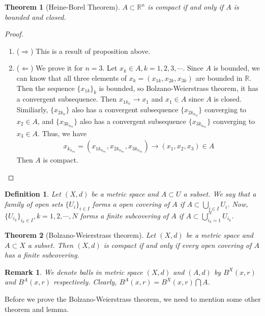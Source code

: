 \documentclass[12pt,leqno]{amsart}
\newtheorem{definition}{Definition}[section]
\newtheorem{theorem}{Theorem}[section]
\newtheorem{remark}{Remark}[section]
\theoremstyle{definition}
\numberwithin{equation}{subsection}
\begin{document}
\begin{theorem}[Heine-Borel Theorem]
$A\subset \mathbb{R}^n$ is compact if and only if $A$ is bounded and closed.
\end{theorem}
\begin{proof}
~\begin{enumerate}
    \item ($\Rightarrow$) This is a result of proposition above.
    \item ($\Leftarrow$) We prove it for $n = 3$. Let $x_k\in A, k = 1,2,3,\cdots$. Since $A$ is bounded, we can know that all three elements of $x_k = (x_{1k},x_{2k},x_{3k})$ are bounded in $\mathbb{R}$. Then the sequence $\{x_{1k}\}_k$ is bounded, so Bolzano-Weierstrass theorem, it has a convergent subsequence. Then $x_{1k_n}\to x_1$ and $x_1\in A$ since $A$ is closed. Similiarly, $\{x_{2k_n}\}$ also has a convergent subsequence $\{x_{2k_{n_m}}\}$ converging to $x_2\in A$, and $\{x_{3k_{n_m}}\}$ also has a convergent subsequence $\{x_{3k_{n_{m_l}}}\}$ converging to $x_3\in A$. Thus, we have 
    \begin{align*}
        x_{k_{n_{m_l}}} = \left(x_{1k_{n_{m_l}}},x_{2k_{n_{m_l}}},x_{3k_{n_{m_l}}}\right)\to (x_1,x_2,x_3)\in A
    \end{align*}
    Then $A$ is compact.
\end{enumerate}
\end{proof}

\medskip

\begin{definition}
Let $(X,d)$ be a metric space and $A\subset U$ a subset. We say that a family of open sets $\{U_i\}_{i\in I}$ forms a open covering of $A$ if $A\subset  \bigcup_{i\in I} U_i$. Now, $\{U_{i_k}\}_{i_k\in I}, k = 1,2,\cdots,N$ forms a finite subcovering of $A$ if $A\subset \bigcup_{i_k=1}^N U_{i_k}$.
\end{definition}

\medskip

\begin{theorem}[Bolzano-Weierstrass theorem]
Let $(X,d)$ be a metric space and $A\subset X$ a subset. Then $(X,d)$ is compact if and only if every open covering of $A$ has a finite subcovering.
\end{theorem}
\begin{remark}
We denote balls in metric space $(X,d)$ and $(A,d)$ by $B^X(x,r)$ and $B^A(x,r)$ respectively. Clearly, $B^A(x,r) = B^X(x,r)\bigcap A$.
\end{remark}

Before we prove the Bolzano-Weierstrass theorem, we need to mention some other theorem and lemma. 
\end{document}
